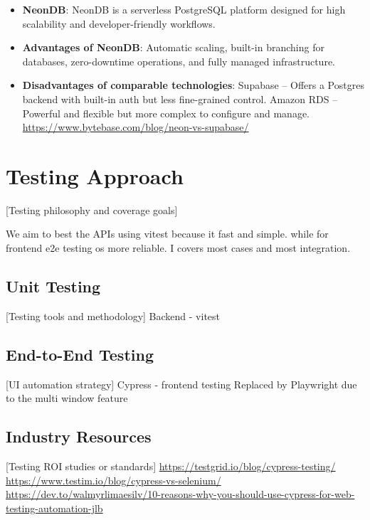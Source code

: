 \begin{itemize}
    \item \textbf{NeonDB}: NeonDB is a serverless PostgreSQL platform designed for high scalability and developer-friendly workflows.
    \item \textbf{Advantages of NeonDB}: Automatic scaling, built-in branching for databases, zero-downtime operations, and fully managed infrastructure.
    \item \textbf{Disadvantages of comparable technologies}: 
    Supabase – Offers a Postgres backend with built-in auth but less fine-grained control. 
    Amazon RDS – Powerful and flexible but more complex to configure and manage.
    \url{https://www.bytebase.com/blog/neon-vs-supabase/}
\end{itemize}



\section{Testing Approach}
[Testing philosophy and coverage goals]

We aim to best the APIs using vitest because it fast and simple.
while for frontend e2e testing os more reliable. I covers most cases and most integration. 

\subsection{Unit Testing}
[Testing tools and methodology]
Backend - vitest

\subsection{End-to-End Testing}
[UI automation strategy]
Cypress - frontend testing Replaced by Playwright due to the multi window feature

\subsection{Industry Resources}
[Testing ROI studies or standards]
\url{https://testgrid.io/blog/cypress-testing/}
\url{https://www.testim.io/blog/cypress-vs-selenium/}
\url{https://dev.to/walmyrlimaesilv/10-reasons-why-you-should-use-cypress-for-web-testing-automation-jlb}

